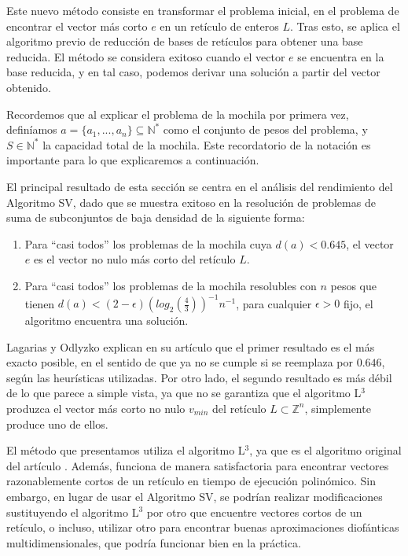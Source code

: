     Este nuevo método consiste en transformar el problema inicial, en el problema de encontrar el vector más corto $e$ en un retículo de enteros $L$. Tras esto, se aplica el algoritmo previo de reducción de bases de retículos para obtener una base reducida. El método se considera exitoso cuando el vector $e$ se encuentra en la base reducida, y en tal caso, podemos derivar una solución a partir del vector obtenido.

    Recordemos que al explicar el problema de la mochila por primera vez, definíamos $a = \{a_{1}, ... , a_{n}\} \subseteq \mathbb{N}^{*}$ como el conjunto de pesos del problema, y $S \in \mathbb{N}^{*}$ la capacidad total de la mochila. Este recordatorio de la notación es importante para lo que explicaremos a continuación.

    El principal resultado de esta sección se centra en el análisis del rendimiento del Algoritmo SV, dado que se muestra exitoso en la resolución de problemas de suma de subconjuntos de baja densidad de la siguiente forma:

    \newpage
    
    \begin{enumerate}
        \item Para ``casi todos'' los problemas de la mochila cuya $d(a) < 0.645$, el vector $e$ es el vector no nulo más corto del retículo $L$.
        \item  Para ``casi todos'' los problemas de la mochila resolubles con $n$ pesos que tienen $d(a) < (2 - \epsilon)(log_{2} (\frac{4}{3}))^{-1}n^{-1}$, para cualquier $\epsilon > 0$ fijo, el algoritmo encuentra una solución.
    \end{enumerate}
    
    Lagarias y Odlyzko explican en su artículo que el primer resultado es el más exacto posible, en el sentido de que ya no se cumple si se reemplaza por $0.646$, según las heurísticas utilizadas. Por otro lado, el segundo resultado es más débil de lo que parece a simple vista, ya que no se garantiza que el algoritmo L$^{3}$ produzca el vector más corto no nulo $v_{min}$ del retículo $L \subset \mathbb{Z}^{n}$, simplemente produce uno de ellos. 

    El método que presentamos utiliza el algoritmo L$^{3}$, ya que es el algoritmo original del artículo \cite{artLagOdl}. Además, funciona de manera satisfactoria para encontrar vectores razonablemente cortos de un retículo en tiempo de ejecución polinómico. Sin embargo, en lugar de usar el Algoritmo SV, se podrían realizar modificaciones sustituyendo el algoritmo L$^{3}$ por otro que encuentre vectores cortos de un retículo, o incluso, utilizar otro para encontrar buenas aproximaciones diofánticas multidimensionales, que podría funcionar bien en la práctica.

